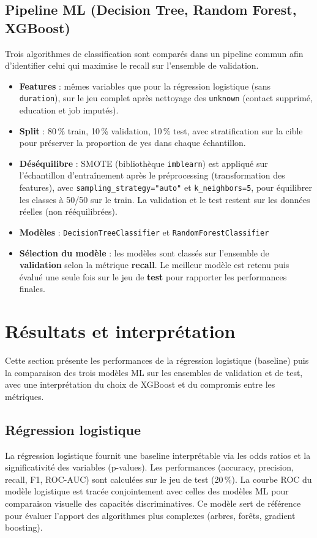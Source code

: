 \documentclass[11pt,a4paper]{article}
\begin{document}
\subsection{Pipeline ML (Decision Tree, Random Forest, XGBoost)}
Trois algorithmes de classification sont comparés dans un pipeline commun afin d'identifier celui qui maximise le recall sur l'ensemble de validation.
\begin{itemize}
  \item \textbf{Features} : mêmes variables que pour la régression logistique (sans \texttt{duration}), sur le jeu complet après nettoyage des \texttt{unknown} (contact supprimé, education et job imputés).
  \item \textbf{Split} : 80\,\% train, 10\,\% validation, 10\,\% test, avec stratification sur la cible pour préserver la proportion de yes dans chaque échantillon.
  \item \textbf{Déséquilibre} : SMOTE (bibliothèque \texttt{imblearn}) est appliqué sur l'échantillon d'entraînement après le préprocessing (transformation des features), avec \texttt{sampling\_strategy="auto"} et \texttt{k\_neighbors=5}, pour équilibrer les classes à 50/50 sur le train. La validation et le test restent sur les données réelles (non rééquilibrées).
  \item \textbf{Modèles} : \texttt{DecisionTreeClassifier} et \texttt{RandomForestClassifier} 
  \item \textbf{Sélection du modèle} : les modèles sont classés sur l'ensemble de \textbf{validation} selon la métrique \textbf{recall}. Le meilleur modèle est retenu puis évalué une seule fois sur le jeu de \textbf{test} pour rapporter les performances finales.
\end{itemize}

\section{Résultats et interprétation}

Cette section présente les performances de la régression logistique (baseline) puis la comparaison des trois modèles ML sur les ensembles de validation et de test, avec une interprétation du choix de XGBoost et du compromis entre les métriques.

\subsection{Régression logistique}
La régression logistique fournit une baseline interprétable via les odds ratios et la significativité des variables (p-values). Les performances (accuracy, precision, recall, F1, ROC-AUC) sont calculées sur le jeu de test (20\,\%). La courbe ROC du modèle logistique est tracée conjointement avec celles des modèles ML pour comparaison visuelle des capacités discriminatives. Ce modèle sert de référence pour évaluer l'apport des algorithmes plus complexes (arbres, forêts, gradient boosting).
\end{document}
